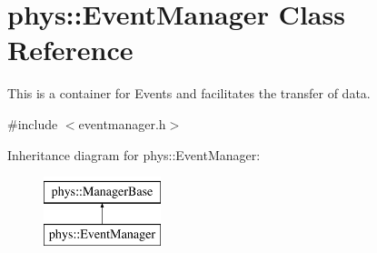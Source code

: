 \hypertarget{classphys_1_1EventManager}{
\section{phys::EventManager Class Reference}
\label{da/dde/classphys_1_1EventManager}
}


This is a container for Events and facilitates the transfer of data.  




{\ttfamily \#include $<$eventmanager.h$>$}

Inheritance diagram for phys::EventManager:\begin{figure}[H]
\begin{center}
\leavevmode
\includegraphics[height=2.000000cm]{da/dde/classphys_1_1EventManager}
\end{center}
\end{figure}
